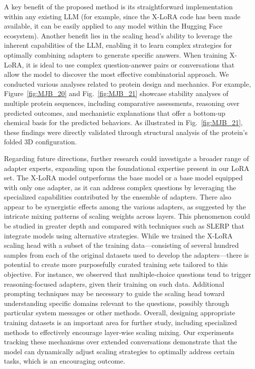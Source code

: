 A key benefit of the proposed method is its straightforward implementation within any existing LLM (for example, since the X-LoRA code has been made available, it can be easily applied to any model within the Hugging Face ecosystem). Another benefit lies in the scaling head's ability to leverage the inherent capabilities of the LLM, enabling it to learn complex strategies for optimally combining adapters to generate specific answers. When training X-LoRA, it is ideal to use complex question-answer pairs or conversations that allow the model to discover the most effective combinatorial approach. We conducted various analyses related to protein design and mechanics. For example, Figure~\ref{fig:MJB_20} and Fig.~\ref{fig:MJB_21} showcase stability analyses of multiple protein sequences, including comparative assessments, reasoning over predicted outcomes, and mechanistic explanations that offer a bottom-up chemical basis for the predicted behaviors. As illustrated in Fig.~\ref{fig:MJB_21}, these findings were directly validated through structural analysis of the protein’s folded 3D configuration.

Regarding future directions, further research could investigate a broader range of adapter experts, expanding upon the foundational expertise present in our LoRA set. The X-LoRA model outperforms the base model or a base model equipped with only one adapter, as it can address complex questions by leveraging the specialized capabilities contributed by the ensemble of adapters. There also appear to be synergistic effects among the various adapters, as suggested by the intricate mixing patterns of scaling weights across layers. This phenomenon could be studied in greater depth and compared with techniques such as SLERP that integrate models using alternative strategies. While we trained the X-LoRA scaling head with a subset of the training data—consisting of several hundred samples from each of the original datasets used to develop the adapters—there is potential to create more purposefully curated training sets tailored to this objective. For instance, we observed that multiple-choice questions tend to trigger reasoning-focused adapters, given their training on such data. Additional prompting techniques may be necessary to guide the scaling head toward understanding specific domains relevant to the questions, possibly through particular system messages or other methods. Overall, designing appropriate training datasets is an important area for further study, including specialized methods to effectively encourage layer-wise scaling mixing. Our experiments tracking these mechanisms over extended conversations demonstrate that the model can dynamically adjust scaling strategies to optimally address certain tasks, which is an encouraging outcome.

